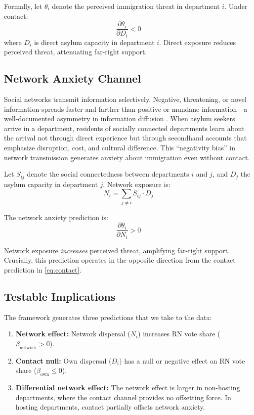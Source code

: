 \documentclass[12pt]{article}
\begin{document}
Formally, let $\theta_i$ denote the perceived immigration threat in department $i$. Under contact:
\begin{equation}
\frac{\partial \theta_i}{\partial D_i} < 0
\label{eq:contact}
\end{equation}
where $D_i$ is direct asylum capacity in department $i$. Direct exposure reduces perceived threat, attenuating far-right support.

\subsection{Network Anxiety Channel}

Social networks transmit information selectively. Negative, threatening, or novel information spreads faster and farther than positive or mundane information---a well-documented asymmetry in information diffusion \citep{baumeister2001bad, soroka2014negativity}. When asylum seekers arrive in a department, residents of socially connected departments learn about the arrival not through direct experience but through secondhand accounts that emphasize disruption, cost, and cultural difference. This ``negativity bias'' in network transmission generates anxiety about immigration even without contact.

Let $S_{ij}$ denote the social connectedness between departments $i$ and $j$, and $D_j$ the asylum capacity in department $j$. Network exposure is:
\begin{equation}
N_i = \sum_{j \neq i} S_{ij} \cdot D_j
\label{eq:network}
\end{equation}

The network anxiety prediction is:
\begin{equation}
\frac{\partial \theta_i}{\partial N_i} > 0
\label{eq:network_anxiety}
\end{equation}

Network exposure \textit{increases} perceived threat, amplifying far-right support. Crucially, this prediction operates in the opposite direction from the contact prediction in \eqref{eq:contact}.

\subsection{Testable Implications}

The framework generates three predictions that we take to the data:

\begin{enumerate}
\item \textbf{Network effect:} Network dispersal ($N_i$) increases RN vote share ($\beta_{\text{network}} > 0$).
\item \textbf{Contact null:} Own dispersal ($D_i$) has a null or negative effect on RN vote share ($\beta_{\text{own}} \leq 0$).
\item \textbf{Differential network effect:} The network effect is larger in non-hosting departments, where the contact channel provides no offsetting force. In hosting departments, contact partially offsets network anxiety.
\end{enumerate}
\end{document}
